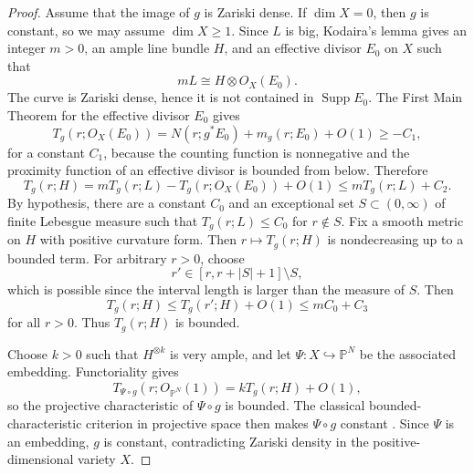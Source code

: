 \documentclass[11pt]{amsart}
\def\OO{O}%
\numberwithin{equation}{section}
\theoremstyle{definition}
\theoremstyle{remark}
\newcommand{\PP}{\mathbb P}
\newcommand{\OO}{\mathcal O}
\begin{document}
\begin{proof}
Assume that the image of $g$ is Zariski dense.  If $\dim X=0$, then $g$ is constant, so we may assume $\dim X\ge1$.  Since $L$ is big, Kodaira's lemma gives an integer $m>0$, an ample line bundle $H$, and an effective divisor $E_0$ on $X$ such that
\begin{equation*}
mL\cong H\otimes\OO_X(E_0).
\end{equation*}
The curve is Zariski dense, hence it is not contained in $\operatorname{Supp}E_0$.  The First Main Theorem for the effective divisor $E_0$ gives
\begin{equation*}
T_g(r;\OO_X(E_0))
=
N(r;g^*E_0)+m_g(r;E_0)+O(1)
\ge -C_1,
\end{equation*}
for a constant $C_1$, because the counting function is nonnegative and the proximity function of an effective divisor is bounded from below.  Therefore
\begin{equation*}
T_g(r;H)
=
mT_g(r;L)-T_g(r;\OO_X(E_0))+O(1)
\le mT_g(r;L)+C_2.
\end{equation*}
By hypothesis, there are a constant $C_0$ and an exceptional set $S\subset(0,\infty)$ of finite Lebesgue measure such that $T_g(r;L)\le C_0$ for $r\notin S$.  Fix a smooth metric on $H$ with positive curvature form.  Then $r\mapsto T_g(r;H)$ is nondecreasing up to a bounded term.  For arbitrary $r>0$, choose
\begin{equation*}
r'\in [r,r+|S|+1]\setminus S,
\end{equation*}
which is possible since the interval length is larger than the measure of $S$.  Then
\begin{equation*}
T_g(r;H)\le T_g(r';H)+O(1)\le mC_0+C_3
\end{equation*}
for all $r>0$.  Thus $T_g(r;H)$ is bounded.

Choose $k>0$ such that $H^{\otimes k}$ is very ample, and let $\Psi:X\hookrightarrow\PP^N$ be the associated embedding.  Functoriality gives
\begin{equation*}
T_{\Psi\circ g}(r;\OO_{\PP^N}(1))=kT_g(r;H)+O(1),
\end{equation*}
so the projective characteristic of $\Psi\circ g$ is bounded.  The classical bounded-characteristic criterion in projective space then makes $\Psi\circ g$ constant \cite{GriffithsKing1973Nevanlinna,NoguchiWinkelmann2014Nevanlinna}.  Since $\Psi$ is an embedding, $g$ is constant, contradicting Zariski density in the positive-dimensional variety $X$.
\end{proof}
\end{document}

